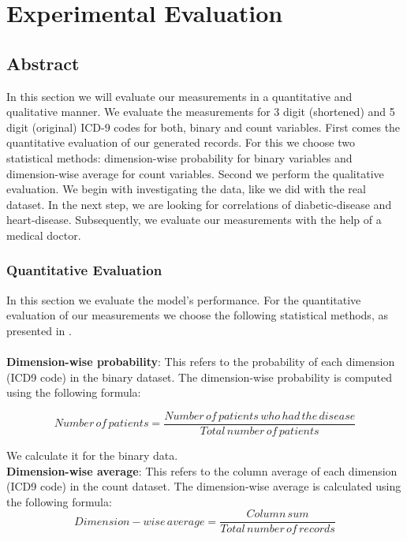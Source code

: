 \documentclass[11pt, a4paper]{book}
\begin{document}
\chapter{Experimental Evaluation}
\section{Abstract}
In this section we will evaluate our measurements in a quantitative and qualitative manner. We evaluate the measurements for 3 digit (shortened) and 5 digit (original) ICD-9 codes for both, binary and count variables.
First comes the quantitative evaluation of our generated records. For this we choose two statistical methods: dimension-wise probability for binary variables and dimension-wise average for count variables.
Second we perform the qualitative evaluation. We begin with investigating the data, like we did with the real dataset. In the next step, we are looking for correlations of diabetic-disease and heart-disease. Subsequently, we evaluate our measurements with the help of a medical doctor.

\subsection{Quantitative Evaluation}
In this section we evaluate the model's performance. For the quantitative evaluation of our measurements we choose the following statistical methods, as presented in \cite{Choi2017}.
\\
\\
\textbf{Dimension-wise probability}: This refers to the probability of each dimension (ICD9 code) in the binary dataset. The dimension-wise probability is computed using the following formula: 

\begin{equation}
Number\,of\,patients = \frac{Number\,of\,patients\, who \,had \,the \,disease}{Total \,number \,of \,patients}
\end{equation}

We calculate it for the binary data.
\\

\textbf{Dimension-wise average}: This refers to the column average of each dimension (ICD9 code) in the count dataset. The dimension-wise average is calculated using the following formula: 
\begin{equation}
Dimension-wise\,average = \frac{Column \,sum}{Total \,number \,of \,records}
\end{equation}
\end{document}
